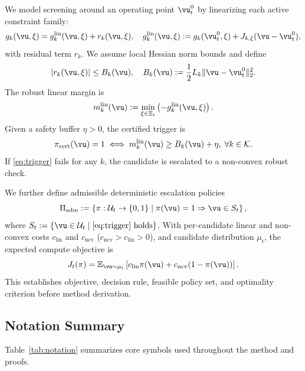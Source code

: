 \documentclass{article} %
\begin{document}
We model screening around an operating point $\vu_t^0$ by linearizing each active constraint family:
\begin{equation}
g_k(\vu,\xi) = g_k^{\mathrm{lin}}(\vu,\xi) + r_k(\vu,\xi), \quad
 g_k^{\mathrm{lin}}(\vu,\xi) := g_k(\vu_t^0,\xi) + J_{k,\xi}(\vu-\vu_t^0),
\label{eq:linearization}
\end{equation}
with residual term $r_k$. We assume local Hessian norm bounds and define
\begin{equation}
|r_k(\vu,\xi)| \le B_k(\vu), \quad B_k(\vu) := \frac{1}{2}L_k\|\vu-\vu_t^0\|_2^2.
\label{eq:residual_bound}
\end{equation}
The robust linear margin is
\begin{equation}
m_k^{\mathrm{lin}}(\vu) := \min_{\xi\in\Xi_t}\left(-g_k^{\mathrm{lin}}(\vu,\xi)\right).
\label{eq:margin}
\end{equation}
Given a safety buffer $\eta>0$, the certified trigger is
\begin{equation}
\pi_{\mathrm{cert}}(\vu)=1 \iff m_k^{\mathrm{lin}}(\vu)\ge B_k(\vu)+\eta,\;\forall k\in\mathcal{K}.
\label{eq:trigger}
\end{equation}
If \eqref{eq:trigger} fails for any $k$, the candidate is escalated to a non-convex robust check.

We further define admissible deterministic escalation policies
\begin{equation}
\Pi_{\mathrm{adm}} := \left\{\pi: \mathcal{U}_t\to\{0,1\} \;\middle|\; \pi(\vu)=1 \Rightarrow \vu\in S_t\right\},
\label{eq:admissible}
\end{equation}
where $S_t:=\{\vu\in\mathcal{U}_t \mid \eqref{eq:trigger}\ \text{holds}\}$. With per-candidate linear and non-convex costs $c_{\mathrm{lin}}$ and $c_{\mathrm{ncv}}$ ($c_{\mathrm{ncv}}>c_{\mathrm{lin}}>0$), and candidate distribution $\mu_t$, the expected compute objective is
\begin{equation}
J_t(\pi)=\mathbb{E}_{\vu\sim\mu_t}\left[c_{\mathrm{lin}}\pi(\vu)+c_{\mathrm{ncv}}(1-\pi(\vu))\right].
\label{eq:compute_objective}
\end{equation}
This establishes objective, decision rule, feasible policy set, and optimality criterion before method derivation.

\subsection{Notation Summary}
Table~\ref{tab:notation} summarizes core symbols used throughout the method and proofs.
\end{document}

